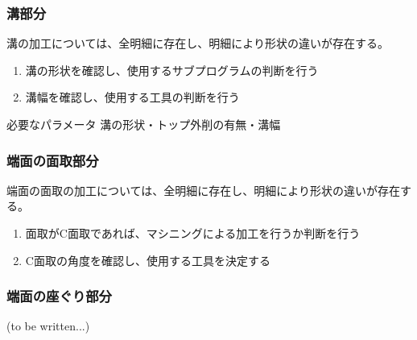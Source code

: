 \subsubsection{溝部分}
溝の加工については、全明細に存在し、明細により形状の違いが存在する。
\begin{enumerate}
\item {}溝の形状を確認し、使用するサブプログラムの判断を行う
\item {}溝幅を確認し、使用する工具の判断を行う
\end{enumerate}
\begin{Parameter}{必要なパラメータ}
溝の形状・トップ外削の有無・溝幅
\end{Parameter}

\subsubsection{端面の面取部分}
端面の面取の加工については、全明細に存在し、明細により形状の違いが存在する。
\begin{enumerate}
\item 面取がC面取であれば、マシニングによる加工を行うか判断を行う
\item {}C面取の角度を確認し、使用する工具を決定する
\end{enumerate}

\subsubsection{端面の座ぐり部分\TBW}
(to be written...)


